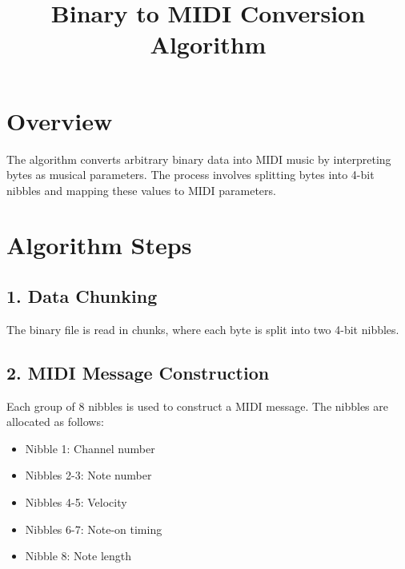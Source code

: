 \documentclass{article}
\begin{document}
\title{Binary to MIDI Conversion Algorithm}
\author{}
\date{}
\maketitle

\section{Overview}
The algorithm converts arbitrary binary data into MIDI music by interpreting bytes as musical parameters. The process involves splitting bytes into 4-bit nibbles and mapping these values to MIDI parameters.

\section{Algorithm Steps}

\subsection{1. Data Chunking}
The binary file is read in chunks, where each byte is split into two 4-bit nibbles.

\begin{center}
\end{center}
    
\subsection{2. MIDI Message Construction}
Each group of 8 nibbles is used to construct a MIDI message. The nibbles are allocated as follows:

\begin{itemize}
    \item Nibble 1: Channel number
    \item Nibbles 2-3: Note number
    \item Nibbles 4-5: Velocity
    \item Nibbles 6-7: Note-on timing
    \item Nibble 8: Note length
\end{itemize}
\end{document}
